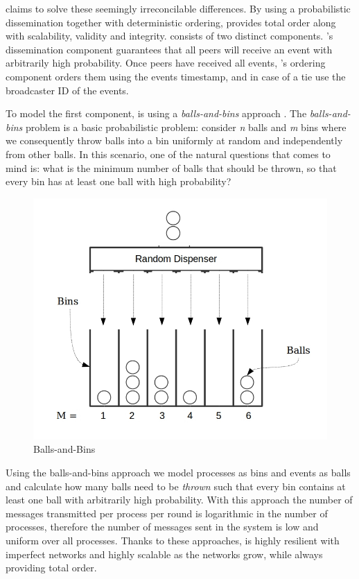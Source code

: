 \epto claims to solve these seemingly irreconcilable differences. By using a probabilistic dissemination together with deterministic ordering, \epto provides total order along with scalability, validity and integrity. \epto consists of two distinct components. \epto's dissemination component guarantees that all peers will receive an event with arbitrarily high probability. Once peers have received all events, \epto's ordering component orders them using the events timestamp, and in case of a tie use the broadcaster ID of the events.
\par
To model the first component, \epto is using a \textit{balls-and-bins} approach \autocite{Koldehofe02simplegossiping}. The \textit{balls-and-bins} problem is a basic probabilistic problem: consider \textit{n} balls and \textit{m} bins where we consequently throw balls into a bin uniformly at random and independently from other balls. In this scenario, one of the natural questions that comes to mind is: what is the minimum number of balls that should be thrown, so that every bin has at least one ball with high probability?
\begin{figure}
	\includegraphics[width=\linewidth]{figures/BnB.jpeg}
	\caption[Caption]{Balls-and-Bins\footnotemark}
	\label{fig:balls-and-bins}
\end{figure}
\par
Using the balls-and-bins approach we model processes as bins and events as balls and calculate how many balls need to be \textit{thrown} such that every bin contains at least one ball with arbitrarily high probability. With this approach the number of messages transmitted per process per round is logarithmic in the number of processes, therefore the number of messages sent in the system is low and uniform over all processes. Thanks to these approaches, \epto is highly resilient with  imperfect networks and highly scalable as the networks grow, while always providing total order. \par
